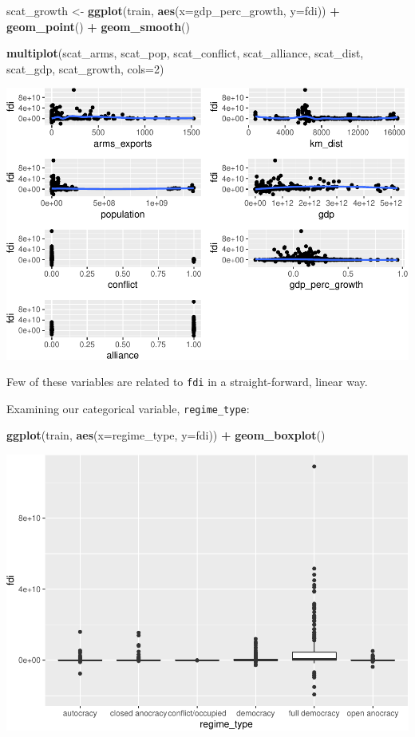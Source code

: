 \documentclass[11pt,]{article}
\newenvironment{Shaded}{\begin{snugshade}}{\end{snugshade}}
\newcommand{\DataTypeTok}[1]{\textcolor[rgb]{0.13,0.29,0.53}{#1}}
\newcommand{\DecValTok}[1]{\textcolor[rgb]{0.00,0.00,0.81}{#1}}
\newcommand{\KeywordTok}[1]{\textcolor[rgb]{0.13,0.29,0.53}{\textbf{#1}}}
\newcommand{\NormalTok}[1]{#1}
\newcommand{\OperatorTok}[1]{\textcolor[rgb]{0.81,0.36,0.00}{\textbf{#1}}}
\newcommand{\StringTok}[1]{\textcolor[rgb]{0.31,0.60,0.02}{#1}}
\begin{document}
\begin{Shaded}
\begin{Highlighting}[]
\NormalTok{scat_growth <-}\StringTok{ }\KeywordTok{ggplot}\NormalTok{(train, }\KeywordTok{aes}\NormalTok{(}\DataTypeTok{x=}\NormalTok{gdp_perc_growth, }\DataTypeTok{y=}\NormalTok{fdi)) }\OperatorTok{+}
\StringTok{    }\KeywordTok{geom_point}\NormalTok{() }\OperatorTok{+}
\StringTok{    }\KeywordTok{geom_smooth}\NormalTok{()}

\KeywordTok{multiplot}\NormalTok{(scat_arms, scat_pop, scat_conflict, scat_alliance,}
\NormalTok{          scat_dist, scat_gdp, scat_growth, }\DataTypeTok{cols=}\DecValTok{2}\NormalTok{)}
\end{Highlighting}
\end{Shaded}

\includegraphics{report_files/figure-latex/unnamed-chunk-10-1.pdf}

Few of these variables are related to \texttt{fdi} in a
straight-forward, linear way.

Examining our categorical variable, \texttt{regime\_type}:

\begin{Shaded}
\begin{Highlighting}[]
\KeywordTok{ggplot}\NormalTok{(train, }\KeywordTok{aes}\NormalTok{(}\DataTypeTok{x=}\NormalTok{regime_type, }\DataTypeTok{y=}\NormalTok{fdi)) }\OperatorTok{+}
\StringTok{    }\KeywordTok{geom_boxplot}\NormalTok{()}
\end{Highlighting}
\end{Shaded}

\includegraphics{report_files/figure-latex/unnamed-chunk-11-1.pdf}
\end{document}
